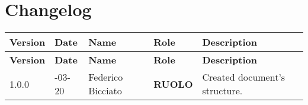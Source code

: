 \section*{Changelog}
\renewcommand{\arraystretch}{1.5}
	\begin{longtable}{ 
			>{\centering}p{} 
			>{\centering}p{}
			>{\centering}p{} 
			>{\centering}p{} 
			>{}p{} }
		
		\rowcolorhead
		\textbf{\color{white}Version} & 
		\textbf{\color{white}Date} & 
		\textbf{\color{white}Name} & 
		\textbf{\color{white}Role} &
		\centering \textbf{\color{white}Description} 
		\tabularnewline  
		\endfirsthead
		\rowcolorhead
		\textbf{\color{white}Version} & 
		\textbf{\color{white}Date} & 
		\textbf{\color{white}Name} & 
		\textbf{\color{white}Role} &
		\centering \textbf{\color{white}Description} 
		\tabularnewline  
		\endhead
		
		1.0.0 & 2019-03-20 & Federico Bicciato & 
		\textbf{RUOLO} & Created document's structure.
		\tabularnewline 
		
	
	\end{longtable}
\renewcommand{\arraystretch}{1} 
